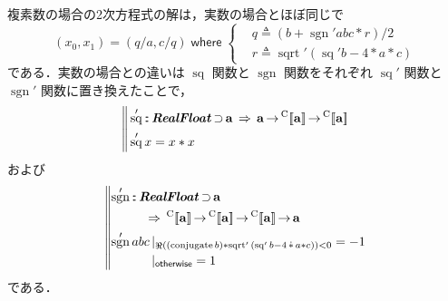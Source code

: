 \documentclass[a5paper,twoside,fleqn,draft]{jsbook}
\def\[{[\![}
\def\]{]\!]}
\DeclareMathOperator{\sgn}{sgn}
\newcommand{\mBrace}{\Vert}
\newcommand{\mKeyword}[1]{\mathsf{#1}}
\newcommand{\mOtherwiseKeyword}{\mKeyword{otherwise}}
\newcommand{\mWhereKeyword}{\mKeyword{where}}
\DeclareMathOperator{\mOtherwise}{\mOtherwiseKeyword}
\DeclareMathOperator{\mSuperClass}{\;\Rightarrow\;}
\DeclareMathOperator{\mSuperSet}{\supset}
\DeclareMathOperator{\mWhere}{\mWhereKeyword}
\newcommand{\mSpecialFunc}[1]{\mathrm{#1}}
\DeclareMathOperator{\mConjugate}{\mSpecialFunc{conjugate}}
\DeclareMathOperator{\mRealPart}{\Re}
\DeclareMathOperator{\mSq}{\mSpecialFunc{sq}}
\DeclareMathOperator{\mSqrt}{\mSpecialFunc{sqrt}}
\DeclareMathOperator{\mComplexTimes}{\Dot\ast}
\DeclareMathOperator{\mFuncArrow}{\rightarrow}
\DeclareMathOperator{\mIn}{{:\!:}}
\DeclareMathOperator{\mLetEq}{\triangleq}
\newcommand{\mType}[1]{\mathbf{#1}} %
\newcommand{\mA}{\mType{a}}
\newcommand{\mTypeAssemble}[2]{{}^\mathrm{#1}\[\mType{#2}\]}
\newcommand{\mCompFunclexType}[1]{\mTypeAssemble{C}{#1}} %
\newcommand{\mTypeClass}[1]{\textbf{\textit{#1}}}
\newcommand{\mRealFloatTypeClass}{\mTypeClass{RealFloat}}
\newcommand{\mGuard}[1]{\mathop{\mid_{#1}}}
\begin{document}
複素数の場合の2次方程式の解は，実数の場合とほぼ同じで
\begin{equation}
  (x_0,x_1)=(q/a,c/q)\mWhere\left\{
  \begin{aligned}
    &q\mLetEq\left(b+\sgn'abc*r\right)/2\\
    &r\mLetEq\mSqrt'{(\mSq'b-4*a*c)}
  \end{aligned}
  \right.
\end{equation}
である．実数の場合との違いは $\mSq$ 関数と $\sgn$ 関数をそれぞれ
$\mSq'$ 関数と $\sgn'$ 関数に置き換えたことで，
\begin{equation}
  \left\mBrace
  \begin{aligned}
    &\mSq'
    \mIn\mRealFloatTypeClass\mSuperSet\mA
    \mSuperClass\mA
    \mFuncArrow\mCompFunclexType{a}
    \mFuncArrow\mCompFunclexType{a}\\
    &\mSq'x
    =x*x
  \end{aligned}
  \right.
\end{equation}
および
\begin{equation}
  \left\mBrace
  \begin{aligned}
    &\begin{aligned}
       \sgn'
       &\mIn\mRealFloatTypeClass\mSuperSet\mA\\
       &\quad\mSuperClass\mCompFunclexType{a}
       \mFuncArrow\mCompFunclexType{a}
       \mFuncArrow\mCompFunclexType{a}
       \mFuncArrow\mA
     \end{aligned}\\
    &\begin{aligned}
       \sgn'abc
       &\mGuard{\mRealPart((\mConjugate b)*\mSqrt'{(\mSq' b-4\mComplexTimes a*c)})<0}
       =-1\\
       &\mGuard{\mOtherwise}
       =1
     \end{aligned}
  \end{aligned}
  \right.
\end{equation}
である．
\end{document}
